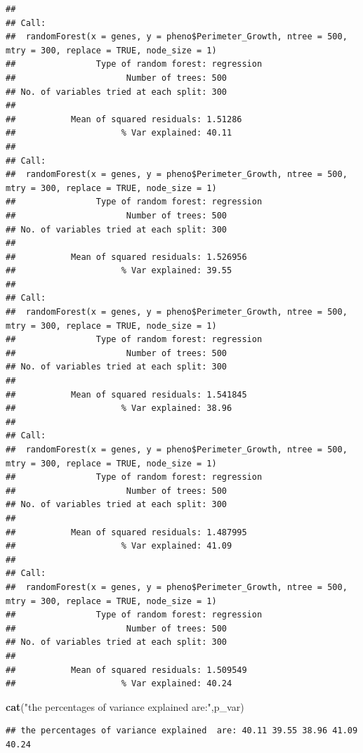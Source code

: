 \documentclass[
]{article}
\newenvironment{Shaded}{\begin{snugshade}}{\end{snugshade}}
\newcommand{\FunctionTok}[1]{\textcolor[rgb]{0.13,0.29,0.53}{\textbf{#1}}}
\newcommand{\NormalTok}[1]{#1}
\newcommand{\StringTok}[1]{\textcolor[rgb]{0.31,0.60,0.02}{#1}}
\begin{document}
\begin{verbatim}
## 
## Call:
##  randomForest(x = genes, y = pheno$Perimeter_Growth, ntree = 500,      mtry = 300, replace = TRUE, node_size = 1) 
##                Type of random forest: regression
##                      Number of trees: 500
## No. of variables tried at each split: 300
## 
##           Mean of squared residuals: 1.51286
##                     % Var explained: 40.11
## 
## Call:
##  randomForest(x = genes, y = pheno$Perimeter_Growth, ntree = 500,      mtry = 300, replace = TRUE, node_size = 1) 
##                Type of random forest: regression
##                      Number of trees: 500
## No. of variables tried at each split: 300
## 
##           Mean of squared residuals: 1.526956
##                     % Var explained: 39.55
## 
## Call:
##  randomForest(x = genes, y = pheno$Perimeter_Growth, ntree = 500,      mtry = 300, replace = TRUE, node_size = 1) 
##                Type of random forest: regression
##                      Number of trees: 500
## No. of variables tried at each split: 300
## 
##           Mean of squared residuals: 1.541845
##                     % Var explained: 38.96
## 
## Call:
##  randomForest(x = genes, y = pheno$Perimeter_Growth, ntree = 500,      mtry = 300, replace = TRUE, node_size = 1) 
##                Type of random forest: regression
##                      Number of trees: 500
## No. of variables tried at each split: 300
## 
##           Mean of squared residuals: 1.487995
##                     % Var explained: 41.09
## 
## Call:
##  randomForest(x = genes, y = pheno$Perimeter_Growth, ntree = 500,      mtry = 300, replace = TRUE, node_size = 1) 
##                Type of random forest: regression
##                      Number of trees: 500
## No. of variables tried at each split: 300
## 
##           Mean of squared residuals: 1.509549
##                     % Var explained: 40.24
\end{verbatim}

\begin{Shaded}
\begin{Highlighting}[]
\FunctionTok{cat}\NormalTok{(}\StringTok{"the percentages of variance explained  are:"}\NormalTok{,p\_var)}
\end{Highlighting}
\end{Shaded}

\begin{verbatim}
## the percentages of variance explained  are: 40.11 39.55 38.96 41.09 40.24
\end{verbatim}
\end{document}
